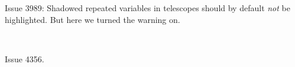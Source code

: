 \documentclass{article}
\begin{document}
Issue 3989: Shadowed repeated variables in telescopes should by
default \emph{not} be highlighted.
But here we turned the warning on.

\begin{code}%
\>[0]\AgdaSpace{}%
\AgdaSymbol{:}\AgdaSpace{}%
\AgdaSymbol{(}\AgdaSpace{}%
\AgdaSpace{}%
\AgdaSymbol{:}\AgdaSpace{}%
\AgdaSymbol{)}\AgdaSpace{}%
\AgdaSpace{}%
\<%
\\
\>[0]\AgdaSpace{}%
\AgdaSymbol{\AgdaUnderscore{}}\AgdaSpace{}%
\AgdaSpace{}%
\AgdaSymbol{=}\AgdaSpace{}%
\<%
\end{code}

Issue 4356.
\end{document}
